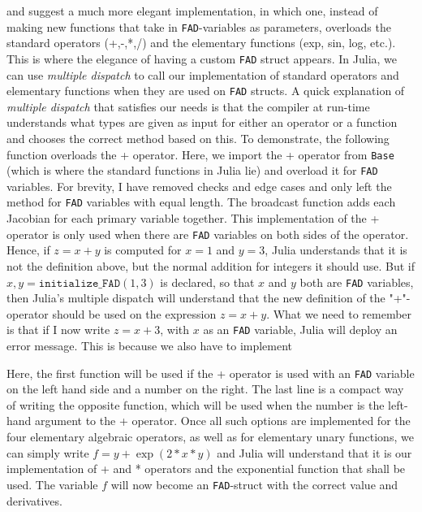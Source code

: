 \cite{doi:10.1137/080743627} and \cite{lieMrstUrl} suggest a much more elegant implementation, in which one, instead of making new functions that take in \texttt{FAD}-variables as parameters, overloads the standard operators (+,-,*,/) and the elementary functions (exp, sin, log, etc.). This is where the elegance of having a custom \texttt{FAD} struct appears. In Julia, we can use \emph{multiple dispatch} to call our implementation of standard operators and elementary functions when they are used on \texttt{FAD} structs. A quick explanation of \emph{multiple dispatch} that satisfies our needs is that the compiler at run-time understands what types are given as input for either an operator or a function and chooses the correct method based on this. To demonstrate, the following function  
overloads the + operator. Here, we import the + operator from \texttt{Base} (which is where the standard functions in Julia lie) and overload it for \texttt{FAD} variables. For brevity, I have removed checks and edge cases and only left the method for \texttt{FAD} variables with equal length. The broadcast function adds each Jacobian for each primary variable together. This implementation of the + operator is only used when there are \texttt{FAD} variables on both sides of the operator. Hence, if $z = x+y$ is computed for $x = 1$ and $y = 3$, Julia understands that it is not the definition above, but the normal addition for integers it should use. But if $x,y = \texttt{initialize\_FAD}(1,3)$ is declared, so that $x$ and $y$ both are \texttt{FAD} variables, then Julia's multiple dispatch will understand that the new definition of the "+"-operator should be used on the expression $z = x+y$. What we need to remember is that if I now write $z = x + 3$, with $x$ as an \texttt{FAD} variable, Julia will deploy an error message. This is because we also have to implement

Here, the first function will be used if the + operator is used with an \texttt{FAD} variable on the left hand side and a number on the right. The last line is a compact way of writing the opposite function, which will be used when the number is the left-hand argument to the + operator. Once all such options are implemented for the four elementary algebraic operators, as well as for elementary unary functions, we can simply write $f = y+\exp(2*x*y)$ and Julia will understand that it is our implementation of + and * operators and the exponential function that shall be used. The variable $f$ will now become an \texttt{FAD}-struct with the correct value and derivatives. 

